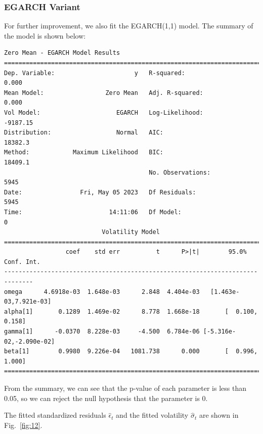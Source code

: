 \documentclass[runningheads]{llncs}
\begin{document}
\subsubsection{EGARCH Variant}

For further improvement, we also fit the EGARCH(1,1) model. The summary of the model is shown below:

\begin{verbatim}
Zero Mean - EGARCH Model Results                       
==============================================================================
Dep. Variable:                      y   R-squared:                       0.000
Mean Model:                 Zero Mean   Adj. R-squared:                  0.000
Vol Model:                     EGARCH   Log-Likelihood:               -9187.15
Distribution:                  Normal   AIC:                           18382.3
Method:            Maximum Likelihood   BIC:                           18409.1
                                        No. Observations:                 5945
Date:                Fri, May 05 2023   Df Residuals:                     5945
Time:                        14:11:06   Df Model:                            0
                           Volatility Model                               
==============================================================================
                 coef    std err          t      P>|t|        95.0% Conf. Int.
------------------------------------------------------------------------------
omega      4.6918e-03  1.648e-03      2.848  4.404e-03   [1.463e-03,7.921e-03]
alpha[1]       0.1289  1.469e-02      8.778  1.668e-18       [  0.100,  0.158]
gamma[1]      -0.0370  8.228e-03     -4.500  6.784e-06 [-5.316e-02,-2.090e-02]
beta[1]        0.9980  9.226e-04   1081.738      0.000       [  0.996,  1.000]
==============================================================================
\end{verbatim}

From the summary, we can see that the p-value of each parameter is less than 0.05, so we can reject the null hypothesis that the parameter is 0.

The fitted standardized residuals $\hat{\epsilon}_t$ and the fitted volatility $\hat{\sigma}_t$ are shown in Fig.~\ref{fig:12}.

\end{document}
